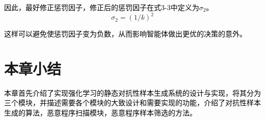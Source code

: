 \textcolor{black}{因此，最好修正惩罚因子，修正后的惩罚因子在式3-3中定义为$\sigma_{2}$。}
\begin{equation}
    \sigma_2=(1/k)^2
\end{equation}

\textcolor{black}{这样可以避免使惩罚因子变为负数，从而影响智能体做出更优的决策的意外。}

\section{本章小结}

\textcolor{black}{本章首先介绍了实现强化学习的静态对抗性样本生成系统的设计与实现，将其分为三个模块，并描述需要各个模块的大致设计和需要实现的功能，介绍了对抗性样本生成的算法，恶意程序扫描模块，恶意程序样本筛选的方法。}